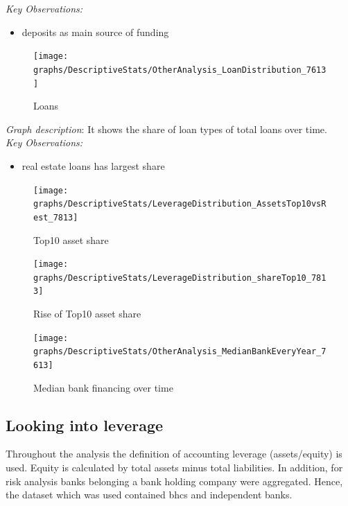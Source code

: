\documentclass[12pt, a4paper]{article} %
\begin{document}
\noindent \textit{Key Observations:}
\begin{itemize}
\item deposits as main source of funding
\end{itemize}




\begin{figure}[hbtp]
\centering
\caption{Loans}
\texttt{[image: graphs/DescriptiveStats/OtherAnalysis\_LoanDistribution\_7613]}
\end{figure}

\noindent \textit{Graph description}: It shows the share of loan types of total loans over time.\\

\noindent \textit{Key Observations:}
\begin{itemize}
\item real estate loans has largest share

\end{itemize}


\begin{figure}[hbtp]
\centering
\caption{Top10 asset share}
\texttt{[image: graphs/DescriptiveStats/LeverageDistribution\_AssetsTop10vsRest\_7813]}
\end{figure}

\pagebreak

\begin{figure}[hbtp]
\centering
\caption{Rise of Top10 asset share}
\texttt{[image: graphs/DescriptiveStats/LeverageDistribution\_shareTop10\_7813]}
\end{figure}



\begin{figure}[hbtp]
\centering
\caption{Median bank financing over time}
\texttt{[image: graphs/DescriptiveStats/OtherAnalysis\_MedianBankEveryYear\_7613]}
\end{figure}

\newpage

\subsection{Looking into leverage}

Throughout the analysis the definition of accounting leverage (assets/equity) is used. Equity is calculated by total assets minus total liabilities. In addition, for risk analysis banks belonging a bank holding company were aggregated. Hence, the dataset which was used contained bhcs and independent banks.
\end{document}
